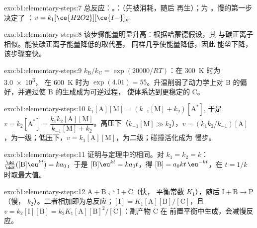 \begin{solution}{exo:b1:elementary-steps:7}
总反应：。：（先被消耗，随后
再生）；为 。慢的第一步决定了
：$v = k_1[\ce{H2O2}][\ce{I-}]$。
\end{solution}

\begin{solution}{exo:b1:elementary-steps:8}
该步骤能量明显升高：根据哈蒙德假设，其
与碳正离子相似。能使碳正离子能量降低的取代基，
同样几乎使能量降低，因此
能垒下降，该步骤变快。
\end{solution}

\begin{solution}{exo:b1:elementary-steps:9}
$k_{\mathrm B}/k_{\mathrm C} = \exp(20000/RT)$：在 \qty{300}{K} 时为 \num{3.0e3}，
在 \qty{600}{K} 时为 $\exp(4.01) = 55$。升温削弱了动力学上对
B 的偏好，并通过使 B 的生成成为可逆过程，
使体系达到更稳定的 C。
\end{solution}

\begin{solution}{exo:b1:elementary-steps:10}
$k_1[\mathrm{A}][\mathrm{M}] = (k_{-1}[\mathrm{M}] + k_2)[\mathrm{A}^*]$,
于是 $v = k_2[\mathrm{A}^*] = \dfrac{k_1k_2[\mathrm{A}][\mathrm{M}]}{k_{-1}[\mathrm{M}]
+ k_2}$。高压下（$k_{-1}[\mathrm{M}] \gg k_2$），$v =
(k_1k_2/k_{-1})[\mathrm{A}]$，为一级；低压下，$v =
k_1[\mathrm{A}][\mathrm{M}]$，为二级；碰撞活化成为
慢步。
\end{solution}

\begin{solution}{exo:b1:elementary-steps:11}
证明与定理中的相同。对 $k_1 = k_2 = k$：
$\frac{\dd}{\dd t}([\mathrm{B}]\eu^{kt}) = ka_0$，于是 $[\mathrm{B}]\eu^{kt} =
ka_0t$，得 $[\mathrm{B}] = a_0kt\,\eu^{-kt}$，在 $t = 1/k$ 时取最大值。
\end{solution}

\begin{solution}{exo:b1:elementary-steps:12}
$\mathrm{A} + \mathrm{B} \rightleftharpoons \mathrm{I} + \mathrm{C}$（快，
平衡常数 $K_1$），随后 $\mathrm{I} + \mathrm{B} \to \mathrm{P}$（慢，
$k_2$）。二者相加即为总反应；$[\mathrm{I}] =
K_1[\mathrm{A}][\mathrm{B}]/[\mathrm{C}]$，且 $v = k_2[\mathrm{I}][\mathrm{B}]
= k_2K_1[\mathrm{A}][\mathrm{B}]^2/[\mathrm{C}]$：副产物 C 在
前置平衡中生成，会减慢反应。
\end{solution}

